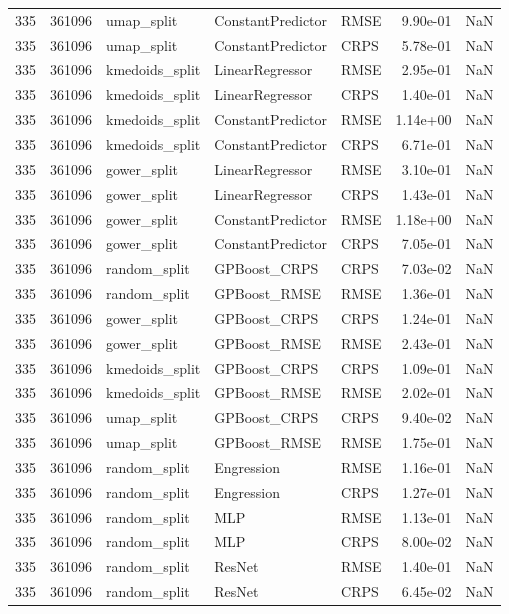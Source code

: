 \begin{tabular}{rrlllrr}
335 & 361096 & umap\_split & ConstantPredictor & RMSE & 9.90e-01 & NaN \\
335 & 361096 & umap\_split & ConstantPredictor & CRPS & 5.78e-01 & NaN \\
335 & 361096 & kmedoids\_split & LinearRegressor & RMSE & 2.95e-01 & NaN \\
335 & 361096 & kmedoids\_split & LinearRegressor & CRPS & 1.40e-01 & NaN \\
335 & 361096 & kmedoids\_split & ConstantPredictor & RMSE & 1.14e+00 & NaN \\
335 & 361096 & kmedoids\_split & ConstantPredictor & CRPS & 6.71e-01 & NaN \\
335 & 361096 & gower\_split & LinearRegressor & RMSE & 3.10e-01 & NaN \\
335 & 361096 & gower\_split & LinearRegressor & CRPS & 1.43e-01 & NaN \\
335 & 361096 & gower\_split & ConstantPredictor & RMSE & 1.18e+00 & NaN \\
335 & 361096 & gower\_split & ConstantPredictor & CRPS & 7.05e-01 & NaN \\
335 & 361096 & random\_split & GPBoost\_CRPS & CRPS & 7.03e-02 & NaN \\
335 & 361096 & random\_split & GPBoost\_RMSE & RMSE & 1.36e-01 & NaN \\
335 & 361096 & gower\_split & GPBoost\_CRPS & CRPS & 1.24e-01 & NaN \\
335 & 361096 & gower\_split & GPBoost\_RMSE & RMSE & 2.43e-01 & NaN \\
335 & 361096 & kmedoids\_split & GPBoost\_CRPS & CRPS & 1.09e-01 & NaN \\
335 & 361096 & kmedoids\_split & GPBoost\_RMSE & RMSE & 2.02e-01 & NaN \\
335 & 361096 & umap\_split & GPBoost\_CRPS & CRPS & 9.40e-02 & NaN \\
335 & 361096 & umap\_split & GPBoost\_RMSE & RMSE & 1.75e-01 & NaN \\
335 & 361096 & random\_split & Engression & RMSE & 1.16e-01 & NaN \\
335 & 361096 & random\_split & Engression & CRPS & 1.27e-01 & NaN \\
335 & 361096 & random\_split & MLP & RMSE & 1.13e-01 & NaN \\
335 & 361096 & random\_split & MLP & CRPS & 8.00e-02 & NaN \\
335 & 361096 & random\_split & ResNet & RMSE & 1.40e-01 & NaN \\
335 & 361096 & random\_split & ResNet & CRPS & 6.45e-02 & NaN \\

\end{tabular}
